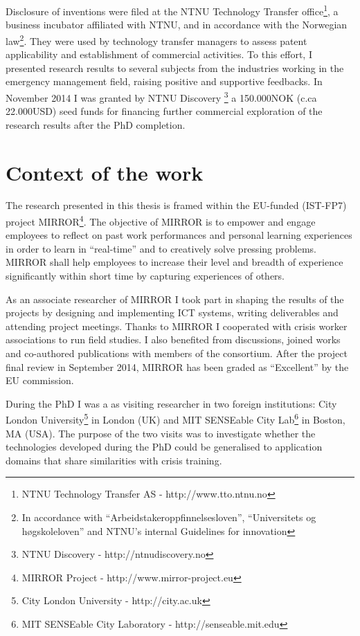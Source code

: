 Disclosure of inventions were filed at the NTNU Technology Transfer office\footnote{NTNU Technology Transfer AS - http://www.tto.ntnu.no}, a business incubator affiliated with NTNU, and in accordance with the Norwegian law\footnote{In accordance with ``Arbeidstakeroppfinnelsesloven'', ``Universitets og høgskoleloven'' and NTNU's internal Guidelines for innovation}. They were used by technology transfer managers to assess patent applicability and establishment of commercial activities. To this effort, I presented research results to several subjects from the industries working in the emergency management field, raising positive and supportive feedbacks. In November 2014 I was granted by NTNU Discovery \footnote{NTNU Discovery - http://ntnudiscovery.no} a 150.000NOK (c.ca 22.000USD) seed funds for financing further commercial exploration of the research results after the PhD completion.

\section{Context of the work}\label{context-of-the-work}

The research presented in this thesis is framed within the EU-funded (IST-FP7) project MIRROR\footnote{MIRROR Project - http://www.mirror-project.eu}. The objective of MIRROR is to empower and engage employees to reflect on past work performances and personal learning experiences in order to learn in “real-time” and to creatively solve pressing problems. MIRROR shall help employees to increase their level and breadth of experience significantly within short time by capturing experiences of others.  

As an associate researcher of MIRROR I took part in shaping the results of the projects by designing and implementing ICT systems, writing deliverables and attending project meetings. Thanks to MIRROR I cooperated with crisis worker associations to run field studies. I also benefited from discussions, joined works and co-authored publications with members of the consortium. After the project final review in September 2014, MIRROR has been graded as ``Excellent'' by the EU commission.

During the PhD I was a as visiting researcher in two foreign institutions: City London University\footnote{City London University - http://city.ac.uk} in London (UK) and MIT SENSEable City Lab\footnote{MIT SENSEable City Laboratory - http://senseable.mit.edu} in Boston, MA (USA). The purpose of the two visits was to investigate whether the technologies developed during the PhD could be generalised to application domains that share similarities with crisis training.

